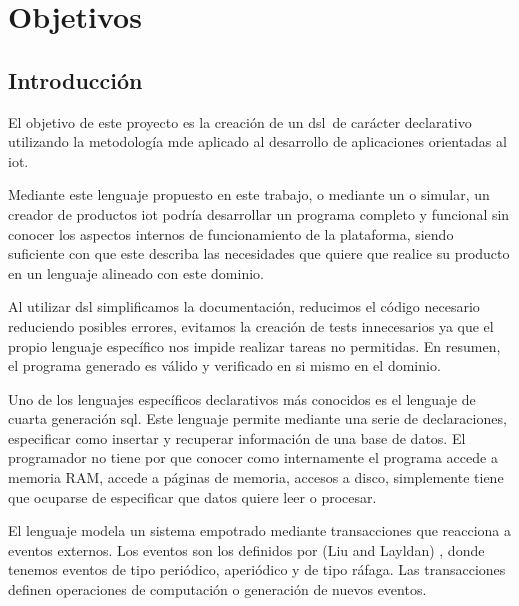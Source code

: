 \section{Objetivos}

\subsection{Introducción}

El objetivo de este proyecto es la creación de un \gls{dsl} de carácter declarativo utilizando la metodología \gls{mde} aplicado al desarrollo de aplicaciones orientadas al \gls{iot}.

Mediante este lenguaje propuesto en este trabajo, o mediante un o simular, un creador de productos \gls{iot} podría desarrollar un programa completo y funcional sin conocer los aspectos internos de funcionamiento de la plataforma, siendo suficiente con que este describa las necesidades que quiere que realice su producto en un lenguaje alineado con este dominio.

Al utilizar \gls{dsl} simplificamos la documentación, reducimos el código necesario reduciendo posibles errores, evitamos la creación de tests innecesarios ya que el propio lenguaje específico nos impide realizar tareas no permitidas. En resumen, el programa generado es válido y verificado en si mismo en el dominio.

Uno de los lenguajes específicos declarativos más conocidos es el lenguaje de cuarta generación \gls{sql}. Este lenguaje permite mediante una serie de declaraciones, especificar como insertar y recuperar información de una base de datos.
El programador no tiene por que conocer como internamente el programa accede a memoria RAM,  accede a páginas de memoria, accesos a disco, simplemente tiene que ocuparse de especificar que datos quiere leer o procesar.


El lenguaje modela un sistema empotrado mediante transacciones que reacciona a eventos externos. 
Los  eventos son los definidos por (Liu and Layldan) \textcite{scheduling_sporadic_aperiodic_events}
, donde tenemos eventos de tipo periódico, aperiódico y de tipo ráfaga. Las transacciones definen operaciones de computación o generación de nuevos eventos.



